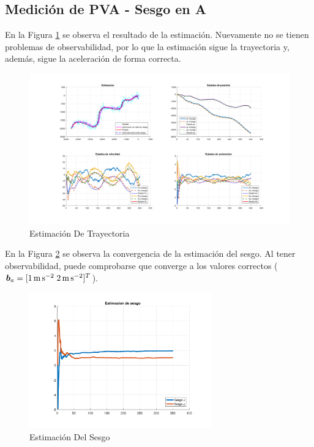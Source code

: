 
\subsection{Medición de PVA - Sesgo en A}

	En la Figura \ref{fig:ej3f} se observa el resultado de la estimación. Nuevamente no se tienen problemas de observabilidad, por lo que la estimación sigue la trayectoria y, además, sigue la aceleración de forma correcta.

	\begin{figure}[H]
		\centering
		\includegraphics[scale=0.5,trim={6,5cm 0 0 0}]{Figuras/graf_ej4f.pdf}
		\caption{Estimación De Trayectoria}
		\label{fig:ej3f}
	\end{figure}
	
	En la Figura \ref{fig:ej3f_bias} se observa la convergencia de la estimación del sesgo. Al tener observabilidad, puede comprobarse que converge a los valores correctos ($\vect{b}_a = [\SI{1}{\m\per\s\squared} \; \SI{2}{\m\per\s\squared}]^T$).
	
	\begin{figure}[H]
		\centering
		\includegraphics[width=0.7\textwidth,keepaspectratio]{Figuras/bias_ej4f.pdf}
		\caption{Estimación Del Sesgo}
		\label{fig:ej3f_bias}
	\end{figure}
	
